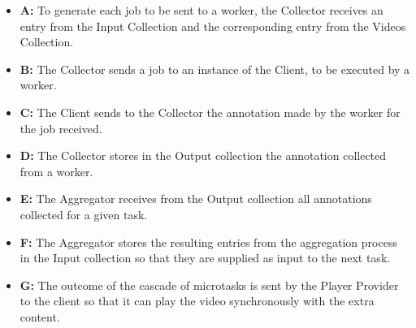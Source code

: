 \begin{itemize}
\item \textbf{A:} To generate each job to be sent to a worker, the Collector receives an entry from the Input Collection and the corresponding entry from the Videos Collection.

\item \textbf{B:} The Collector sends a job to an instance of the Client, to be executed by a worker.

\item \textbf{C:} The Client sends to the Collector the annotation made by the worker for the job received.

\item \textbf{D:} The Collector stores in the Output collection the annotation collected from a worker.

\item \textbf{E:} The Aggregator receives from the Output collection all annotations collected for a given task.

\item \textbf{F:} The Aggregator stores the resulting entries from the aggregation process in the Input collection so that they are supplied as input to the next task.

\item \textbf{G:} The outcome of the cascade of microtasks is sent by the Player Provider to the client so that it can play the video synchronously with the extra content.
\end{itemize}
